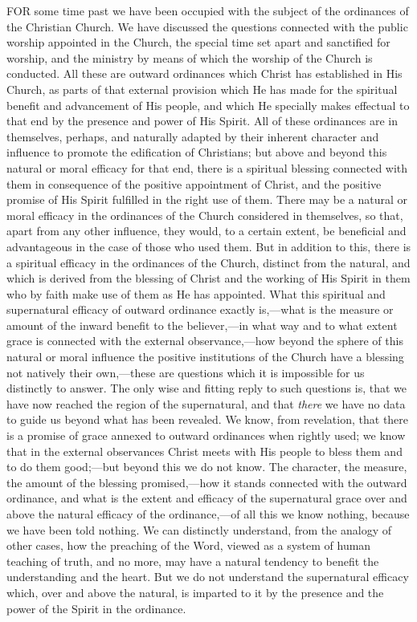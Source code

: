 \documentclass[]{book}
\begin{document}
FOR some time past we have been occupied with the subject of the ordinances of the Christian Church. We have discussed the questions connected with the public worship appointed in the Church, the special time set apart and sanctified for worship, and the ministry by means of which the worship of the Church is conducted. All these are outward ordinances which Christ has established in His Church, as parts of that external provision which He has made for the spiritual benefit and advancement of His people, and which He specially makes effectual to that end by the presence and power of His Spirit. All of these ordinances are in themselves, perhaps, and naturally adapted by their inherent character and influence to promote the edification of Christians; but above and beyond this natural or moral efficacy for that end, there is a spiritual blessing connected with them in consequence of the positive appointment of Christ, and the positive promise of His Spirit fulfilled in the right use of them. There may be a natural or moral efficacy in the ordinances of the Church considered in themselves, so that, apart from any other influence, they would, to a certain extent, be beneficial and advantageous in the case of those who used them. But in addition to this, there is a spiritual efficacy in the ordinances of the Church, distinct from the natural, and which is derived from the blessing of Christ and the working of His Spirit in them who by faith make use of them as He has appointed. What this spiritual and supernatural efficacy of outward ordinance exactly is,---what is the measure or amount of the inward benefit to the believer,---in what way and to what extent grace is connected with the external observance,---how beyond the sphere of this natural or moral influence the positive institutions of the Church have a blessing not natively their own,---these are questions which it is impossible for us distinctly to answer. The only wise and fitting reply to such questions is, that we have now reached the region of the supernatural, and that \emph{there} we have no data to guide us beyond what has been revealed. We know, from revelation, that there is a promise of grace annexed to outward ordinances when rightly used; we know that in the external observances Christ meets with His people to bless them and to do them good;---but beyond this we do not know. The character, the measure, the amount of the blessing promised,---how it stands connected with the outward ordinance, and what is the extent and efficacy of the supernatural grace over and above the natural efficacy of the ordinance,---of all this we know nothing, because we have been told nothing. We can distinctly understand, from the analogy of other cases, how the preaching of the Word, viewed as a system of human teaching of truth, and no more, may have a natural tendency to benefit the understanding and the heart. But we do not understand the supernatural efficacy which, over and above the natural, is imparted to it by the presence and the power of the Spirit in the ordinance.
\end{document}
